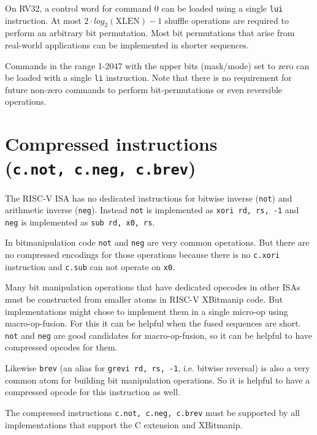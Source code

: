 On RV32, a control word for command 0 can be loaded using a single \texttt{lui} instruction.
At most $2\cdot{}log_2(\textrm{XLEN})-1$ shuffle operations are required to
perform an arbitrary bit permutation. Most bit permutations that arise from
real-world applications can be implemented in shorter sequences.

Commands in the range 1-2047 with the upper bits (mask/mode) set to zero can be
loaded with a single \texttt{li} instruction. Note that there is no
requirement for future non-zero commands to perform bit-permutations or even
reversible operations.




\section{Compressed instructions (\texttt{c.not,\ c.neg,\ c.brev})}

The RISC-V ISA has no dedicated instructions for bitwise inverse (\texttt{not})
and arithmetic inverse (\texttt{neg}). Instead \texttt{not} is implemented as
\texttt{xori\ rd,\ rs,\ -1} and \texttt{neg} is implemented as
\texttt{sub\ rd,\ x0,\ rs}.

In bitmanipulation code \texttt{not} and \texttt{neg} are very common operations. But
there are no compressed encodings for those operations because there is no \texttt{c.xori}
instruction and \texttt{c.sub} can not operate on \texttt{x0}.

Many bit manipulation operations that have dedicated opecodes in other ISAs
must be constructed from smaller atoms in RISC-V XBitmanip code. But
implementations might chose to implement them in a single micro-op using
macro-op-fusion. For this it can be helpful when the fused sequences are short.
\texttt{not} and \texttt{neg} are good candidates for macro-op-fusion, so
it can be helpful to have compressed opcodes for them.

Likewise \texttt{brev} (an alias for \texttt{grevi\ rd,\ rs,\ -1}, i.e. bitwise
reversal) is also a very common atom for building bit manipulation operations. So it
is helpful to have a compressed opcode for this instruction as well.

The compressed instructions \texttt{c.not,\ c.neg,\ c.brev} must be supported by
all implementations that support the C extension and XBitmanip.

